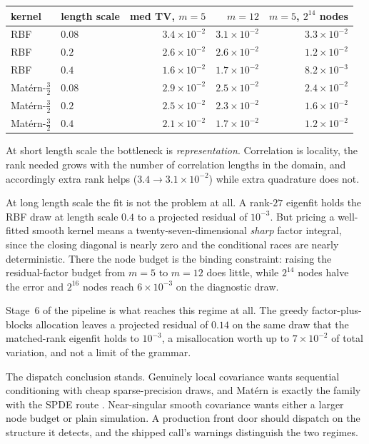\documentclass[11pt]{article}
\begin{document}
\begin{center}\small
\begin{tabular}{llrrr}
\toprule
kernel & length scale & med TV, $m{=}5$ & $m{=}12$ & $m{=}5$, $2^{14}$ nodes\\
\midrule
RBF & $0.08$ & $3.4\times10^{-2}$ & $3.1\times10^{-2}$ & $3.3\times10^{-2}$\\
RBF & $0.2$  & $2.6\times10^{-2}$ & $2.6\times10^{-2}$ & $1.2\times10^{-2}$\\
RBF & $0.4$  & $1.6\times10^{-2}$ & $1.7\times10^{-2}$ & $8.2\times10^{-3}$\\
Mat\'ern-$\tfrac32$ & $0.08$ & $2.9\times10^{-2}$ & $2.5\times10^{-2}$ & $2.4\times10^{-2}$\\
Mat\'ern-$\tfrac32$ & $0.2$  & $2.5\times10^{-2}$ & $2.3\times10^{-2}$ & $1.6\times10^{-2}$\\
Mat\'ern-$\tfrac32$ & $0.4$  & $2.1\times10^{-2}$ & $1.7\times10^{-2}$ & $1.2\times10^{-2}$\\
\bottomrule
\end{tabular}
\end{center}

At short length scale the bottleneck is \emph{representation}.
Correlation is locality, the rank needed grows with the number of
correlation lengths in the domain, and accordingly extra rank helps
($3.4\to3.1\times10^{-2}$) while extra quadrature does not.

At long length scale the fit is not the problem at all. A rank-$27$
eigenfit holds the RBF draw at length scale $0.4$ to a projected residual
of $10^{-3}$. But pricing a well-fitted smooth kernel means a
twenty-seven-dimensional \emph{sharp} factor integral, since the closing
diagonal is nearly zero and the conditional races are nearly
deterministic. There the node budget is the binding constraint:
raising the residual-factor budget from $m=5$ to $m=12$ does little,
while $2^{14}$ nodes halve the error
and $2^{16}$ nodes reach $6\times10^{-3}$ on the diagnostic draw.

Stage~6 of the pipeline is what reaches this regime at all. The greedy
factor-plus-blocks allocation leaves a projected residual of $0.14$ on
the same draw that the matched-rank eigenfit holds to $10^{-3}$, a
misallocation worth up to $7\times10^{-2}$ of total variation, and not a
limit of the grammar.

The dispatch conclusion stands. Genuinely local covariance wants
sequential conditioning with cheap sparse-precision draws, and Mat\'ern
is exactly the family with the SPDE route \citep{lindgren2011}.
Near-singular smooth covariance wants either a larger node budget or
plain simulation. A production front door should dispatch on the
structure it detects, and the shipped call's warnings distinguish the two
regimes.
\end{document}
